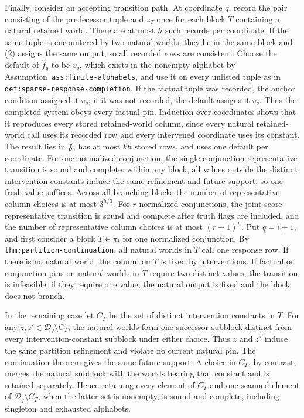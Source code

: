 Finally, consider an accepting transition path. At coordinate \(q\), record the pair consisting of the predecessor tuple and \(z_T\) once for each block \(T\) containing a natural retained world. There are at most \(h\) such records per coordinate. If the same tuple is encountered by two natural worlds, they lie in the same block and (2) assigns the same output, so all recorded rows are consistent. Choose the default of \(\widehat f_q\) to be \(v_q\), which exists in the nonempty alphabet by Assumption~\texttt{ass:finite-alphabets}, and use it on every unlisted tuple as in \texttt{def:sparse-response-completion}. If the factual tuple was recorded, the anchor condition assigned it \(v_q\); if it was not recorded, the default assigns it \(v_q\). Thus the completed system obeys every factual pin. Induction over coordinates shows that it reproduces every stored retained-world column, since every natural retained-world call uses its recorded row and every intervened coordinate uses its constant. The result lies in \(\mathfrak F\), has at most \(kh\) stored rows, and uses one default per coordinate.
For one normalized conjunction, the single-conjunction representative transition is sound and complete: within any block, all values outside the distinct intervention constants induce the same refinement and future support, so one fresh value suffices. Across all branching blocks the number of representative column choices is at most \(3^{h/3}\). For \(r\) normalized conjunctions, the joint-score representative transition is sound and complete after truth flags are included, and the number of representative column choices is at most \((r+1)^h\).
Put \(q=i+1\), and first consider a block \(T\in\pi_i\) for one normalized conjunction. By \texttt{thm:partition-continuation}, all natural worlds in \(T\) call one response row. If there is no natural world, the column on \(T\) is fixed by interventions. If factual or conjunction pins on natural worlds in \(T\) require two distinct values, the transition is infeasible; if they require one value, the natural output is fixed and the block does not branch.

In the remaining case let \(C_T\) be the set of distinct intervention constants in \(T\). For any \(z,z'\in\mathcal D_q\setminus C_T\), the natural worlds form one successor subblock distinct from every intervention-constant subblock under either choice. Thus \(z\) and \(z'\) induce the same partition refinement and violate no current natural pin. The continuation theorem gives the same future support. A choice in \(C_T\), by contrast, merges the natural subblock with the worlds bearing that constant and is retained separately. Hence retaining every element of \(C_T\) and one scanned element of \(\mathcal D_q\setminus C_T\), when the latter set is nonempty, is sound and complete, including singleton and exhausted alphabets.

